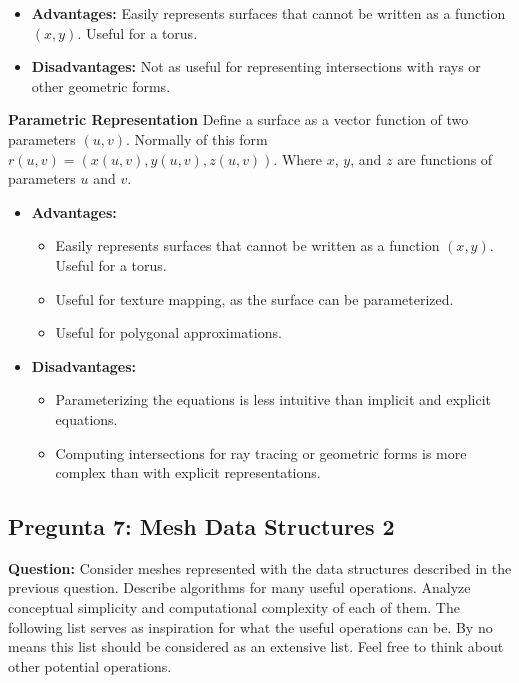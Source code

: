 \documentclass{article}
\begin{document}
\begin{itemize}
    \item \textbf{Advantages:} Easily represents surfaces that cannot be written as a function $(x, y)$. Useful for a torus.
    \item \textbf{Disadvantages:} Not as useful for representing intersections with rays or other geometric forms.
\end{itemize}

\textbf{Parametric Representation} Define a surface as a vector function of two parameters $(u, v)$. Normally of this form $r(u, v) = (x(u, v), y(u, v), z(u, v))$. Where $x$, $y$, and $z$ are functions of parameters $u$ and $v$.

\begin{itemize}
    \item \textbf{Advantages:}
    \begin{itemize}
        \item Easily represents surfaces that cannot be written as a function $(x, y)$. Useful for a torus.
        \item Useful for texture mapping, as the surface can be parameterized.
        \item Useful for polygonal approximations.
    \end{itemize}
    \item \textbf{Disadvantages:}
    \begin{itemize}
        \item Parameterizing the equations is less intuitive than implicit and explicit equations.
        \item Computing intersections for ray tracing or geometric forms is more complex than with explicit representations.
    \end{itemize}
\end{itemize}

\subsection{Pregunta 7: Mesh Data Structures 2}

\textbf{Question:} Consider meshes represented with the data structures described in the previous question. Describe algorithms for many useful operations. Analyze conceptual simplicity and computational complexity of each of them. The following list serves as inspiration for what the useful operations can be. By no means this list should be considered as an extensive list. Feel free to think about other potential operations.
\end{document}
